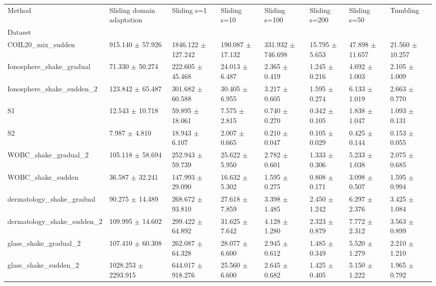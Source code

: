 \begin{tabular}{llllllll}
\toprule
Method & Sliding domain adaptation & Sliding s=1 & Sliding s=10 & Sliding s=100 & Sliding s=200 & Sliding s=50 & Tumbling \\
Dataset &  &  &  &  &  &  &  \\
\midrule
COIL20_mix_sudden & 915.140 $\pm$ 57.926 & 1846.122 $\pm$ 127.242 & 190.087 $\pm$ 17.132 & 331.932 $\pm$ 746.698 & 15.795 $\pm$ 5.653 & 47.898 $\pm$ 11.657 & 21.560 $\pm$ 10.257 \\
Ionosphere_shake_gradual & 71.330 $\pm$ 50.274 & 222.605 $\pm$ 45.468 & 24.013 $\pm$ 6.487 & 2.365 $\pm$ 0.419 & 1.245 $\pm$ 0.216 & 4.692 $\pm$ 1.003 & 2.105 $\pm$ 1.009 \\
Ionosphere_shake_sudden_2 & 123.842 $\pm$ 65.487 & 301.682 $\pm$ 60.588 & 30.405 $\pm$ 6.955 & 3.217 $\pm$ 0.605 & 1.595 $\pm$ 0.274 & 6.133 $\pm$ 1.019 & 2.663 $\pm$ 0.770 \\
S1 & 12.543 $\pm$ 10.718 & 59.895 $\pm$ 18.061 & 7.575 $\pm$ 2.815 & 0.740 $\pm$ 0.270 & 0.342 $\pm$ 0.105 & 1.838 $\pm$ 1.047 & 1.093 $\pm$ 0.131 \\
S2 & 7.987 $\pm$ 4.810 & 18.943 $\pm$ 6.107 & 2.007 $\pm$ 0.665 & 0.210 $\pm$ 0.047 & 0.105 $\pm$ 0.029 & 0.425 $\pm$ 0.144 & 0.153 $\pm$ 0.055 \\
WOBC_shake_gradual_2 & 105.118 $\pm$ 58.694 & 252.943 $\pm$ 59.739 & 25.622 $\pm$ 5.950 & 2.782 $\pm$ 0.601 & 1.333 $\pm$ 0.306 & 5.233 $\pm$ 1.038 & 2.075 $\pm$ 0.685 \\
WOBC_shake_sudden & 36.587 $\pm$ 32.241 & 147.993 $\pm$ 29.090 & 16.632 $\pm$ 5.302 & 1.595 $\pm$ 0.275 & 0.808 $\pm$ 0.171 & 3.098 $\pm$ 0.507 & 1.595 $\pm$ 0.994 \\
dermatology_shake_gradual & 90.275 $\pm$ 14.489 & 268.672 $\pm$ 93.810 & 27.618 $\pm$ 7.859 & 3.398 $\pm$ 1.485 & 2.450 $\pm$ 1.242 & 6.297 $\pm$ 2.376 & 3.425 $\pm$ 1.084 \\
dermatology_shake_sudden_2 & 109.995 $\pm$ 14.602 & 299.422 $\pm$ 64.892 & 31.625 $\pm$ 7.642 & 4.128 $\pm$ 1.280 & 2.323 $\pm$ 0.879 & 7.772 $\pm$ 2.312 & 3.563 $\pm$ 0.899 \\
glass_shake_gradual_2 & 107.410 $\pm$ 60.308 & 262.087 $\pm$ 64.328 & 28.077 $\pm$ 6.600 & 2.945 $\pm$ 0.612 & 1.485 $\pm$ 0.349 & 5.520 $\pm$ 1.279 & 2.210 $\pm$ 1.210 \\
glass_shake_sudden_2 & 1028.253 $\pm$ 2293.915 & 644.017 $\pm$ 918.276 & 25.560 $\pm$ 6.600 & 2.645 $\pm$ 0.682 & 1.425 $\pm$ 0.405 & 5.150 $\pm$ 1.222 & 1.965 $\pm$ 0.792 \\

\end{tabular}
